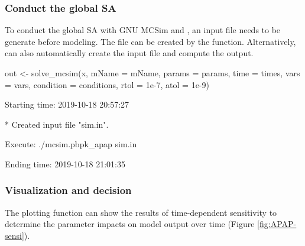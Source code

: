 \hypertarget{conduct-the-global-sa}{%
\subsubsection{Conduct the global SA}\label{conduct-the-global-sa}}

To conduct the global SA with GNU MCSim and , an input
file needs to be generate before modeling. The file can be created by
the  function. Alternatively, 
can also automatically create the input file and compute the output.

\begin{Schunk}
\begin{Sinput}
out <- solve_mcsim(x, mName = mName,
                   params = params, 
                   time = times, 
                   vars = vars,
                   condition = conditions, 
                   rtol = 1e-7, atol = 1e-9)
\end{Sinput}
\begin{Soutput}
  Starting time: 2019-10-18 20:57:27
\end{Soutput}
\begin{Soutput}
  * Created input file "sim.in".
\end{Soutput}
\begin{Soutput}
  Execute: ./mcsim.pbpk_apap sim.in
\end{Soutput}
\begin{Soutput}
  Ending time: 2019-10-18 21:01:35
\end{Soutput}
\end{Schunk}

\hypertarget{visualization-and-decision}{%
\subsubsection{Visualization and
decision}\label{visualization-and-decision}}

The plotting function can show the results of time-dependent sensitivity
to determine the parameter impacts on model output over time (Figure
\ref{fig:APAP-sensi}).

